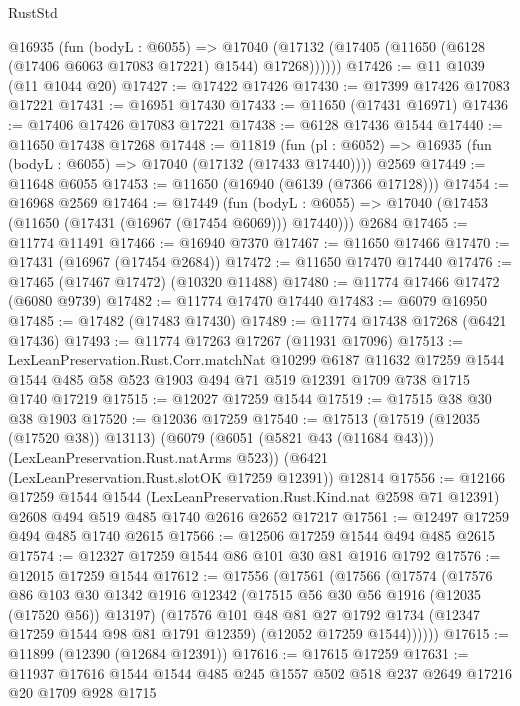 \begin{lexlean}{RustStd}
\begin{coremodule}
      @16935
        (fun (bodyL : @6055) =>
        @17040 (@17132 (@17405 (@11650 (@6128 (@17406 @6063 @17083 @17221) @1544) @17268))))))
@17426 := @11 @1039 (@11 @1044 @20)
@17427 := @17422 @17426
@17430 := @17399 @17426 @17083 @17221
@17431 := @16951 @17430
@17433 := @11650 (@17431 @16971)
@17436 := @17406 @17426 @17083 @17221
@17438 := @6128 @17436 @1544
@17440 := @11650 @17438 @17268
@17448 := @11819
    (fun (pl : @6052) => @16935 (fun (bodyL : @6055) => @17040 (@17132 (@17433 @17440))))
    @2569
@17449 := @11648 @6055
@17453 := @11650 (@16940 (@6139 (@7366 @17128)))
@17454 := @16968 @2569
@17464 := @17449
    (fun (bodyL : @6055) => @17040 (@17453 (@11650 (@17431 (@16967 (@17454 @6069))) @17440)))
    @2684
@17465 := @11774 @11491
@17466 := @16940 @7370
@17467 := @11650 @17466
@17470 := @17431 (@16967 (@17454 @2684))
@17472 := @11650 @17470 @17440
@17476 := @17465 (@17467 @17472) (@10320 @11488)
@17480 := @11774 @17466 @17472 (@6080 @9739)
@17482 := @11774 @17470 @17440
@17483 := @6079 @16950
@17485 := @17482 (@17483 @17430)
@17489 := @11774 @17438 @17268 (@6421 @17436)
@17493 := @11774 @17263 @17267 (@11931 @17096)
@17513 := LexLeanPreservation.Rust.Corr.matchNat
    @10299
    @6187
    @11632
    @17259
    @1544
    @1544
    @485
    @58
    @523
    @1903
    @494
    @71
    @519
    @12391
    @1709
    @738
    @1715
    @1740
    @17219
@17515 := @12027 @17259 @1544
@17519 := @17515 @38 @30 @38 @1903
@17520 := @12036 @17259
@17540 := @17513
    (@17519 (@12035 (@17520 @38)) @13113)
    (@6079 (@6051 (@5821 @43 (@11684 @43))) (LexLeanPreservation.Rust.natArms @523))
    (@6421 (LexLeanPreservation.Rust.slotOK @17259 @12391))
    @12814
@17556 := @12166
    @17259
    @1544
    @1544
    (LexLeanPreservation.Rust.Kind.nat @2598 @71 @12391)
    @2608
    @494
    @519
    @485
    @1740
    @2616
    @2652
    @17217
@17561 := @12497 @17259 @494 @485 @1740 @2615
@17566 := @12506 @17259 @1544 @494 @485 @2615
@17574 := @12327 @17259 @1544 @86 @101 @30 @81 @1916 @1792
@17576 := @12015 @17259 @1544
@17612 := @17556
    (@17561
      (@17566
        (@17574
          (@17576
            @86
            @103
            @30
            @1342
            @1916
            @12342
            (@17515 @56 @30 @56 @1916 (@12035 (@17520 @56)) @13197)
            (@17576
              @101
              @48
              @81
              @27
              @1792
              @1734
              (@12347 @17259 @1544 @98 @81 @1791 @12359)
              (@12052 @17259 @1544))))))
@17615 := @11899 (@12390 (@12684 @12391))
@17616 := @17615 @17259
@17631 := @11937 @17616 @1544 @1544 @485 @245 @1557 @502 @518 @237 @2649 @17216 @20 @1709 @928 @1715

\end{coremodule}
\end{lexlean}
